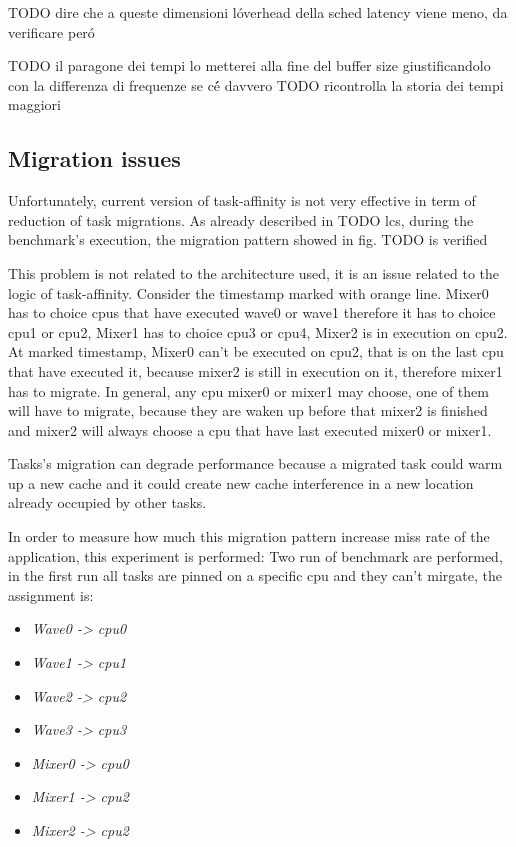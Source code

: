 TODO dire che a queste dimensioni l\'overhead della sched latency viene meno, da verificare per\'o

TODO il paragone dei tempi lo metterei alla fine del buffer size giustificandolo con la differenza di frequenze se c\'\'e davvero
TODO ricontrolla la storia dei tempi maggiori 


\subsection{Migration issues}

Unfortunately, current version of task-affinity is not very effective in term of reduction of task migrations. As already described in TODO lcs, during 
the benchmark's execution, the migration pattern showed in fig. TODO is verified

This problem is not related to the architecture used, it is an issue related to the logic of task-affinity. Consider the timestamp marked with orange line.
Mixer0 has to choice cpus that have executed wave0 or wave1 therefore it has to choice cpu1 or cpu2, Mixer1 has to choice cpu3 or cpu4, Mixer2 is in 
execution on cpu2. At marked timestamp, Mixer0 can't be executed on cpu2, that is on the last cpu that have executed it, because mixer2 is still in 
execution on it, therefore mixer1 has to migrate. In general, any cpu mixer0 or mixer1 may choose, one of them will have to migrate, because they are 
waken up before that mixer2 is finished and mixer2 will always choose a cpu that have last executed mixer0 or mixer1. 

Tasks's migration can degrade performance because a migrated task could warm up a new cache and it could create new cache interference in a new location 
already occupied by other tasks. 

In order to measure how much this migration pattern increase miss rate of the application, this experiment is performed:
Two run of benchmark are performed, in the first run all tasks are pinned on a specific cpu and they can't mirgate, the assignment is: 

\begin{itemize}
\item \textit{Wave0 -> cpu0}
\item \textit{Wave1 -> cpu1}
\item \textit{Wave2 -> cpu2}
\item \textit{Wave3 -> cpu3}
\item \textit{Mixer0 -> cpu0}
\item \textit{Mixer1 -> cpu2}
\item \textit{Mixer2 -> cpu2}
\end{itemize}

